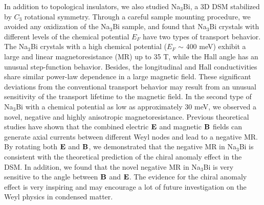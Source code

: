In addition to topological insulators, we also studied Na$_3$Bi, a 3D DSM stabilized by $C_3$ rotational symmetry. Through a careful sample mounting procedure, we avoided any oxidization of the Na$_3$Bi sample, and found that Na$_3$Bi crystals with different levels of the chemical potential $E_F$ have two types of transport behavior. The Na$_3$Bi crystals with a high chemical potential ($E_F$ $\sim$ 400 meV) exhibit a large and linear magnetoresistance (MR) up to 35 T, while the Hall angle has an unusual step-function behavior. Besides, the longitudinal and Hall conductivities share similar power-law dependence in a large magnetic field. These significant deviations from the conventional transport behavior may result from an unusual sensitivity of the transport lifetime to the magnetic field. In the second type of Na$_3$Bi with a chemical potential as low as approximately 30 meV, we observed a novel, negative and highly anisotropic magnetoresistance. Previous theoretical studies have shown that the combined electric $\bf E$ and magnetic $\bf B$ fields can generate axial currents between different Weyl nodes and lead to a negative MR. By rotating both $\bf E$ and $\bf B$, we demonstrated that the negative MR in Na$_3$Bi is consistent with the theoretical prediction of the chiral anomaly effect in the DSM. In addition, we found that the novel negative MR in Na$_3$Bi is very sensitive to the angle between $\bf B$ and $\bf E$. The evidence for the chiral anomaly effect is very inspiring and may encourage a lot of future investigation on the Weyl physics in condensed matter.